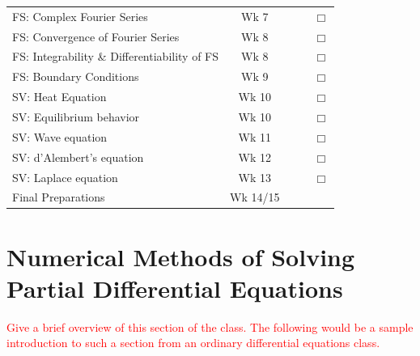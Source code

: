\documentclass{article}
\newcommand{\unchecked}{$\Box$}
\newcommand{\red}[1]{\textcolor{red}{#1}}
\begin{document}
\begin{tabular}{|l|c|c|c|c}
\multirow{2}{5cm}{FS: Complex Fourier Series} & \multirow{2}{1.5cm}{Wk 7} &&& \multirow{2}{.4cm}{\unchecked} \\ &&&& \\ \cline{1-4}
\multirow{2}{7cm}{FS: Convergence of Fourier Series} & \multirow{2}{1.5cm}{Wk 8} &&& \multirow{2}{.4cm}{\unchecked} \\ &&&& \\  \cline{1-4}
\multirow{2}{7cm}{FS: Integrability \& Differentiability of FS} & \multirow{2}{1.5cm}{Wk 8} &&& \multirow{2}{.4cm}{\unchecked} \\ &&&& \\  \cline{1-4}
\multirow{2}{5cm}{FS: Boundary Conditions} & \multirow{2}{1.5cm}{Wk 9} &&& \multirow{2}{.4cm}{\unchecked} \\ &&&& \\ \cline{1-4}
\multirow{2}{5cm}{SV: Heat Equation} & \multirow{2}{1.5cm}{Wk 10} &&& \multirow{2}{.4cm}{\unchecked} \\ &&&& \\ \cline{1-4}
\multirow{2}{5cm}{SV: Equilibrium behavior} & \multirow{2}{1.5cm}{Wk 10} &&& \multirow{2}{.4cm}{\unchecked} \\ &&&& \\ \cline{1-4}
\multirow{2}{5cm}{SV: Wave equation} & \multirow{2}{1.5cm}{Wk 11} &&& \multirow{2}{.4cm}{\unchecked} \\ &&&& \\ \cline{1-4}
\multirow{2}{5cm}{SV: d'Alembert's equation} & \multirow{2}{1.5cm}{Wk 12} &&& \multirow{2}{.4cm}{\unchecked} \\ &&&& \\ \cline{1-4}
\multirow{2}{5cm}{SV: Laplace equation} & \multirow{2}{1.5cm}{Wk 13} &&& \multirow{2}{.4cm}{\unchecked} \\ &&&& \\ \cline{1-4}
\multirow{2}{5cm}{Final Preparations} & \multirow{2}{1.8cm}{Wk 14/15} &&&   \\&&&& \\ \cline{1-4}
\end{tabular}
\newpage

\section{Numerical Methods of Solving Partial Differential Equations}
\red{Give a brief overview of this section of the class. The following would be a sample introduction to such a section from an ordinary differential equations class.}
\end{document}
